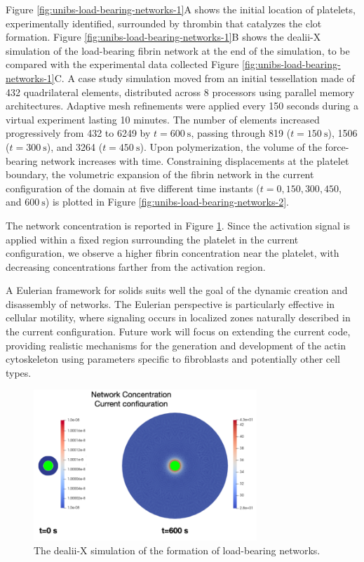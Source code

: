 \documentclass[a4paper,12pt]{article}
\begin{document}
Figure \ref{fig:unibs-load-bearing-networks-1}A shows the initial location of platelets, experimentally identified, surrounded by thrombin that catalyzes the clot formation. Figure \ref{fig:unibs-load-bearing-networks-1}B shows the dealii-X simulation of the load-bearing fibrin network at the end of the simulation, to be compared with the experimental data collected Figure \ref{fig:unibs-load-bearing-networks-1}C. A case study simulation moved from an initial tessellation made of \num{432} quadrilateral elements, distributed across \num{8} processors using parallel memory architectures. Adaptive mesh refinements were applied every \num{150} seconds during a virtual experiment lasting \num{10} minutes. The number of elements increased progressively from \num{432} to \num{6249} by $t = \SI{600}{\second}$, passing through \num{819} ($t = \SI{150}{\second}$), \num{1506} ($t = \SI{300}{\second}$), and \num{3264} ($t = \SI{450}{\second}$). Upon polymerization, the volume of the force-bearing network increases with time. Constraining displacements at the platelet boundary, the volumetric expansion of the fibrin network in the current configuration of the domain at five different time instants ($t = \num{0}, \num{150}, \num{300}, \num{450}$, and $\SI{600}{\second}$) is plotted in Figure \ref{fig:unibs-load-bearing-networks-2}.

The network concentration is reported in Figure \ref{fig:unibs-network-concentration}. Since the activation signal is applied within a fixed region surrounding the platelet in the current configuration, we observe a higher fibrin concentration near the platelet, with decreasing concentrations farther from the activation region.

A Eulerian framework for solids suits well the goal of the dynamic creation and disassembly of networks. The Eulerian perspective is particularly effective in cellular motility, where signaling occurs in localized zones naturally described in the current configuration. Future work will focus on extending the current code, providing realistic mechanisms for the generation and development of the actin cytoskeleton using parameters specific to fibroblasts and potentially other cell types.

\begin{figure}
  \centering

  \includegraphics[width=0.75\textwidth]{unibs-network-concentration.png}

  \caption{The dealii-X simulation of the formation of load-bearing networks.}
  \label{fig:unibs-network-concentration}
\end{figure}
\end{document}
